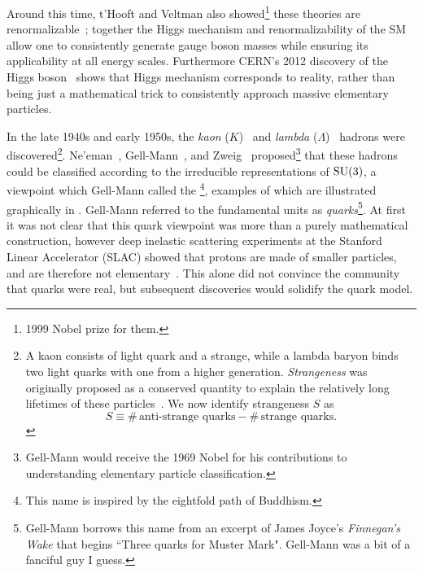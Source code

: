 Around this time, t'Hooft and Veltman
also showed\footnote{1999 Nobel prize for them.} these theories are
renormalizable~\cite{t_hooft_regularization_1972}; together the Higgs mechanism
and renormalizability of the SM allow one to consistently generate gauge boson
masses while ensuring its applicability at all energy scales.
Furthermore CERN's 2012 discovery of the Higgs 
boson~\cite{aad_observation_2012,chatrchyan_observation_2012} shows that Higgs mechanism
corresponds to reality, rather than being just a mathematical trick to 
consistently approach massive elementary particles.





In the late 1940s and early 1950s, the {\it kaon} ($K$)~\cite{rochester_evidence_1947}
 and {\it lambda} ($\Lambda$)~\cite{hopper_evidence_1950}
 hadrons were discovered\footnote{A kaon
consists of light quark and a strange, while a lambda baryon binds two light
quarks with one from a higher generation. {\it Strangeness} 
was originally proposed as a conserved quantity to explain the relatively long
lifetimes of these particles~\cite{pais_remarks_1952,gell-mann_isotopic_1953,
pais_baryon-meson-photon_1953,tadao_charge_1953}.
We now identify strangeness $S$ as
$$
  S\equiv\#\,\text{anti-strange quarks}-\#\,\text{strange quarks}.
$$}. Ne'eman~\cite{neeman_derivation_1961},
Gell-Mann~\cite{gell-mann_symmetries_1962}, and
Zweig~\cite{zweig_su3_1964} proposed\footnote{Gell-Mann would receive the 1969
Nobel for his contributions to understanding elementary particle
classification.} that these hadrons could be classified
according to the irreducible representations of $\operatorname{SU}(3)$, a viewpoint which
Gell-Mann called the \footnote{This
name is inspired by the eightfold path of Buddhism.}, examples of which are
illustrated graphically in . Gell-Mann
referred to the fundamental units as {\it quarks}\footnote{Gell-Mann borrows
this name from an excerpt of James Joyce's {\it Finnegan's Wake} that begins
``Three quarks for Muster Mark".
Gell-Mann was a bit of a fanciful guy I guess.}.
At first it was not clear that this quark viewpoint was more than a
purely mathematical construction, however deep inelastic
scattering
experiments at the Stanford Linear Accelerator (SLAC) showed that
protons are made of smaller particles, and are therefore not
elementary~\cite{bloom_high-energy_1969,breidenbach_observed_1969}.
This alone did not convince the community that quarks were real, but
subsequent discoveries would solidify the quark model.

